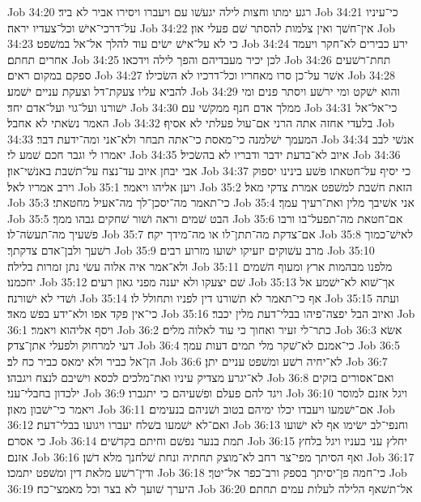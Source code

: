 Job 34:20  רגע ימתו וחצות לילה יגעשׁו עם ויעברו ויסירו אביר לא ביד׃
Job 34:21  כי־עיניו על־דרכי־אישׁ וכל־צעדיו יראה׃
Job 34:22  אין־חשׁך ואין צלמות להסתר שׁם פעלי און׃
Job 34:23  כי לא על־אישׁ ישׂים עוד להלך אל־אל במשׁפט׃
Job 34:24  ירע כבירים לא־חקר ויעמד אחרים תחתם׃
Job 34:25  לכן יכיר מעבדיהם והפך לילה וידכאו׃
Job 34:26  תחת־רשׁעים ספקם במקום ראים׃
Job 34:27  אשׁר על־כן סרו מאחריו וכל־דרכיו לא השׂכילו׃
Job 34:28  להביא עליו צעקת־דל וצעקת עניים ישׁמע׃
Job 34:29  והוא ישׁקט ומי ירשׁע ויסתר פנים ומי ישׁורנו ועל־גוי ועל־אדם יחד׃
Job 34:30  ממלך אדם חנף ממקשׁי עם׃
Job 34:31  כי־אל־אל האמר נשׂאתי לא אחבל׃
Job 34:32  בלעדי אחזה אתה הרני אם־עול פעלתי לא אסיף׃
Job 34:33  המעמך ישׁלמנה כי־מאסת כי־אתה תבחר ולא־אני ומה־ידעת דבר׃
Job 34:34  אנשׁי לבב יאמרו לי וגבר חכם שׁמע לי׃
Job 34:35  איוב לא־בדעת ידבר ודבריו לא בהשׂכיל׃
Job 34:36  אבי יבחן איוב עד־נצח על־תשׁבת באנשׁי־און׃
Job 34:37  כי יסיף על־חטאתו פשׁע בינינו יספוק וירב אמריו לאל׃
Job 35:1  ויען אליהו ויאמר׃
Job 35:2  הזאת חשׁבת למשׁפט אמרת צדקי מאל׃
Job 35:3  כי־תאמר מה־יסכן־לך מה־אעיל מחטאתי׃
Job 35:4  אני אשׁיבך מלין ואת־רעיך עמך׃
Job 35:5  הבט שׁמים וראה ושׁור שׁחקים גבהו ממך׃
Job 35:6  אם־חטאת מה־תפעל־בו ורבו פשׁעיך מה־תעשׂה־לו׃
Job 35:7  אם־צדקת מה־תתן־לו או מה־מידך יקח׃
Job 35:8  לאישׁ־כמוך רשׁעך ולבן־אדם צדקתך׃
Job 35:9  מרב עשׁוקים יזעיקו ישׁועו מזרוע רבים׃
Job 35:10  ולא־אמר איה אלוה עשׂי נתן זמרות בלילה׃
Job 35:11  מלפנו מבהמות ארץ ומעוף השׁמים יחכמנו׃
Job 35:12  שׁם יצעקו ולא יענה מפני גאון רעים׃
Job 35:13  אך־שׁוא לא־ישׁמע אל ושׁדי לא ישׁורנה׃
Job 35:14  אף כי־תאמר לא תשׁורנו דין לפניו ותחולל לו׃
Job 35:15  ועתה כי־אין פקד אפו ולא־ידע בפשׁ מאד׃
Job 35:16  ואיוב הבל יפצה־פיהו בבלי־דעת מלין יכבר׃
Job 36:1  ויסף אליהוא ויאמר׃
Job 36:2  כתר־לי זעיר ואחוך כי עוד לאלוה מלים׃
Job 36:3  אשׂא דעי למרחוק ולפעלי אתן־צדק׃
Job 36:4  כי־אמנם לא־שׁקר מלי תמים דעות עמך׃
Job 36:5  הן־אל כביר ולא ימאס כביר כח לב׃
Job 36:6  לא־יחיה רשׁע ומשׁפט עניים יתן׃
Job 36:7  לא־יגרע מצדיק עיניו ואת־מלכים לכסא וישׁיבם לנצח ויגבהו׃
Job 36:8  ואם־אסורים בזקים ילכדון בחבלי־עני׃
Job 36:9  ויגד להם פעלם ופשׁעיהם כי יתגברו׃
Job 36:10  ויגל אזנם למוסר ויאמר כי־ישׁבון מאון׃
Job 36:11  אם־ישׁמעו ויעבדו יכלו ימיהם בטוב ושׁניהם בנעימים׃
Job 36:12  ואם־לא ישׁמעו בשׁלח יעברו ויגועו בבלי־דעת׃
Job 36:13  וחנפי־לב ישׂימו אף לא ישׁועו כי אסרם׃
Job 36:14  תמת בנער נפשׁם וחיתם בקדשׁים׃
Job 36:15  יחלץ עני בעניו ויגל בלחץ אזנם׃
Job 36:16  ואף הסיתך מפי־צר רחב לא־מוצק תחתיה ונחת שׁלחנך מלא דשׁן׃
Job 36:17  ודין־רשׁע מלאת דין ומשׁפט יתמכו׃
Job 36:18  כי־חמה פן־יסיתך בספק ורב־כפר אל־יטך׃
Job 36:19  היערך שׁועך לא בצר וכל מאמצי־כח׃
Job 36:20  אל־תשׁאף הלילה לעלות עמים תחתם׃
